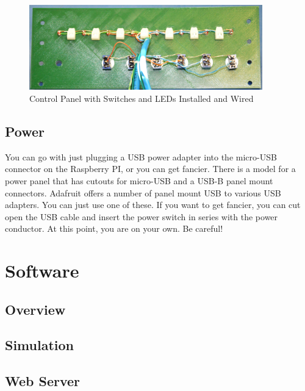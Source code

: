 \documentclass[10pt, openany]{book}
\begin{document}
\begin{figure}[ht!]
  \centering
  \includegraphics[width=0.9\textwidth]{../Pict/Switch3.jpg}
  \caption{Control Panel with Switches and LEDs Installed and Wired}
  \label{fig:Switch3}
\end{figure}

\section{Power}
You can go with just plugging a USB power adapter into the micro-USB connector on the Raspberry PI, or you can get fancier.  There is a model for a power panel that has cutouts for micro-USB and a USB-B panel mount connectors.  Adafruit offers a number of panel mount USB to various USB adapters.  You can just use one of these.  If you want to get fancier, you can cut open the USB cable and insert the power switch in series with the power conductor.  At this point, you are on your own.  Be careful!

\chapter{Software}
\section{Overview}

\section{Simulation}

\section{Web Server}
\end{document}
